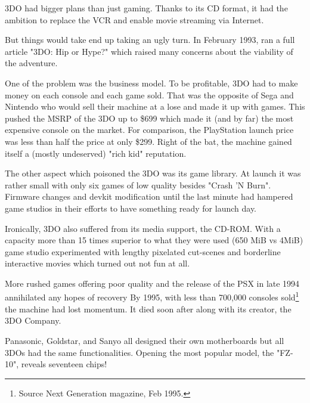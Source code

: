\par
 3DO had bigger plans than just gaming. Thanks to its CD format, it had the ambition to replace the VCR and enable movie streaming via Internet.\\
\par
But things would take end up taking an ugly turn. In February 1993,  ran a full article "3DO: Hip or Hype?" which raised many concerns about the viability of the adventure.\\
\par
One of the problem was the business model. To be profitable, 3DO had to make money on each console and each game sold. That was the opposite of Sega and Nintendo who would sell their machine at a lose and made it up with games. This pushed the MSRP of the 3DO up to \$699 which made it (and by far) the most expensive console on the market. For comparison, the PlayStation launch price was less than half the price at only \$299. Right of the bat, the machine gained itself a (mostly undeserved) "rich kid" reputation.\\
\par
The other aspect which poisoned the 3DO was its game library. At launch it was rather small with only six games of low quality besides "Crash 'N Burn". Firmware changes and devkit modification until the last minute had hampered game studios in their efforts to have something ready for launch day.\\
\par
Ironically, 3DO also suffered from its media support, the CD-ROM. With a capacity more than 15 times superior to what they were used (650 MiB vs 4MiB) game studio experimented with lengthy pixelated cut-scenes and borderline interactive movies which turned out not fun at all.\\
\par
More rushed games offering poor quality and the release of the PSX in late 1994 annihilated any hopes of recovery
By 1995, with less than 700,000 consoles sold\footnote{Source Next Generation magazine, Feb 1995.} the machine had lost momentum. It died soon after along with its creator, the 3DO Company.






\par
Panasonic, Goldstar, and Sanyo all designed their own motherboards but all 3DOs had the same functionalities. Opening the most popular model, the "FZ-10", reveals  seventeen chips!\\
\par
